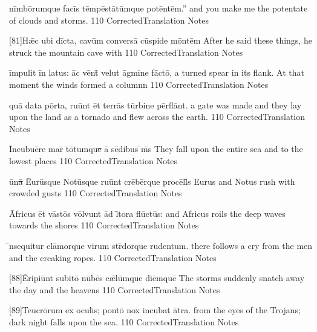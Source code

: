 \documentclass[]{book}
\begin{document}
\latline
  {n\=imb\={\macron o}r\-umqu\-e f\-ac\=is t\=emp\=est\={\macron a}t\=umqu\-e p\-ot\=ent\=em.''
}
  { and you make me the potentate of clouds and storms. }
  {110}
  { CorrectedTranslation }
  { Notes }


\latline
  {[81]H\={\ae}c \-ub\-i d\=ict\-a, c\-av\=um c\-onv\-ers\={\macron a} c\=usp\-id\-e m\=ont\=em
}
  { After he said these things, he struck the mountain cave with }
  {110}
  { CorrectedTranslation }
  { Notes }


\latline
  {\=imp\-ul\-it \=in l\-at\-us:  \=ac v\=ent\={\macron {\i}} v\-el\-ut \=agm\-in\-e f\=act\={\macron o},
}
  { a turned spear in its flank.  At that moment the winds formed a columnn }
  {110}
  { CorrectedTranslation }
  { Notes }

\newpage
\latline
  {qu\={\macron a} d\-at\-a p\=ort\-a, r\-u\=unt \=et t\-err\={\macron a}s t\=urb\-in\-e p\=erfl\=ant.
}
  { a gate was made and they lay upon the land as a tornado and flew across the earth. }
  {110}
  { CorrectedTranslation }
  { Notes }


\latline
  {\=Inc\-ub\-u\={\macron e}r\-e m\-ar\={\macron {\i}} t\={\macron o}tumqu\sout{e }\={\macron a} s\={\macron e}d\-ib\-us \={\macron {\i}}m\={\macron {\i}}s
}
  { They fall upon the entire sea and to the lowest places }
  {110}
  { CorrectedTranslation }
  { Notes }


\latline
  {\={\macron u}n\sout{\={\macron a} }\={Eu}r\=usqu\-e N\-ot\=usqu\-e r\-u\=unt cr\={\macron e}b\=erqu\-e pr\-oc\=ell\={\macron {\i}}s
}
  { Eurus and Notus rush with crowded gusts }
  {110}
  { CorrectedTranslation }
  { Notes }
\newpage

\latline
  {\={\macron A}fr\-ic\-us \=et v\=ast\={\macron o}s v\=olvunt \=ad l\={\macron {\i}}t\-or\-a fl\={\macron u}ct\={\macron u}s:
}
  { and Africus roils the deep waves towards the shores }
  {110}
  { CorrectedTranslation }
  { Notes }


\latline
  {\={\macron {\i}}nsequitur cl\={\macron a}morque virum str\={\macron {\i}}dorque rudentum.
}
  { there follows a cry from the men and the creaking ropes. }
  {110}
  { CorrectedTranslation }
  { Notes }

\latline
  {[88]\={\macron E}r\-ip\-i\=unt s\-ub\-it\={\macron o} n\={\macron u}b\={\macron e}s c\={\ae}l\=umqu\-e d\-i\=emqu\=e
}
  { The storms suddenly snatch away the day and the heavens }
  {110}
  { CorrectedTranslation }
  { Notes }


	\latline
	  {[89]Teucr\={\macron o}rum ex ocul\={\macron \i}s; pont\={\macron o} nox incubat \={\macron a}tra.}
	  { from the eyes of the Trojans; dark night falls upon the sea. }
	  {110}
	  { CorrectedTranslation }
	  { Notes }
\end{document}
